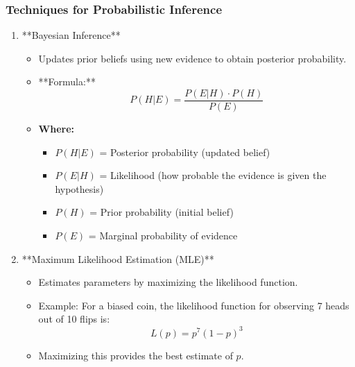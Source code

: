 \documentclass[aspectratio=169]{beamer}
\begin{document}
\begin{frame}[fragile]
    \frametitle{Techniques for Probabilistic Inference}
    \begin{enumerate}
        \item **Bayesian Inference**
        \begin{itemize}
            \item Updates prior beliefs using new evidence to obtain posterior probability.
            \item **Formula:**
            \begin{equation}
            P(H | E) = \frac{P(E | H) \cdot P(H)}{P(E)}
            \end{equation}
            \item \textbf{Where:}
            \begin{itemize}
                \item $P(H | E)$ = Posterior probability (updated belief)
                \item $P(E | H)$ = Likelihood (how probable the evidence is given the hypothesis)
                \item $P(H)$ = Prior probability (initial belief)
                \item $P(E)$ = Marginal probability of evidence
            \end{itemize}
        \end{itemize}

        \item **Maximum Likelihood Estimation (MLE)**
        \begin{itemize}
            \item Estimates parameters by maximizing the likelihood function.
            \item Example: For a biased coin, the likelihood function for observing 7 heads out of 10 flips is:
            \begin{equation}
            L(p) = p^7 (1-p)^3
            \end{equation}
            \item Maximizing this provides the best estimate of $p$.
        \end{itemize}
    \end{enumerate}
\end{frame}
\end{document}
